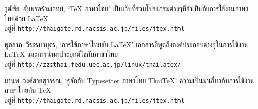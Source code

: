 \begin{thwbr}
\begin{thebibliography}{99}
 วุฒิชัย~อัมพรอร่ามเวทย์, \newblock `\TeX{} ภาษาไทย'
    \newblock เป็นเว็บที่รวมโปรแกรมต่างๆที่จำเป็นกับการใช้งานภาษาไทยด้วย 
    \LaTeX{}\\ 
    อยู่ที่ \texttt{http://thaigate.rd.nacsis.ac.jp/files/ttex.html}

 พูลลาภ~วีระธนาบุตร, \newblock `การใช้ภาษาไทยกับ \LaTeX{}' 
    \newblock เอกสารที่พูดถึงองค์ประกอบต่างๆในการใช้งาน \LaTeX{} 
    และการนำมาประยุกต์ใช้กับภาษาไทย\\
    อยู่ที่ \texttt{http://zzzthai.fedu.uec.ac.jp/linux/thailatex/}
    
 มานพ~วงศ์สายสุวรรณ, \newblock `รู้จักกับ Typesetter ภาษาไทย Thai\TeX{}' 
    \newblock ความเป็นมาเกี่ยวกับการใช้งานภาษาไทยกับ \TeX{}\\
    อยู่ที่ \texttt{http://thaigate.rd.nacsis.ac.jp/files/ttex.html}

\end{thebibliography}
\end{thwbr}
\wbrin